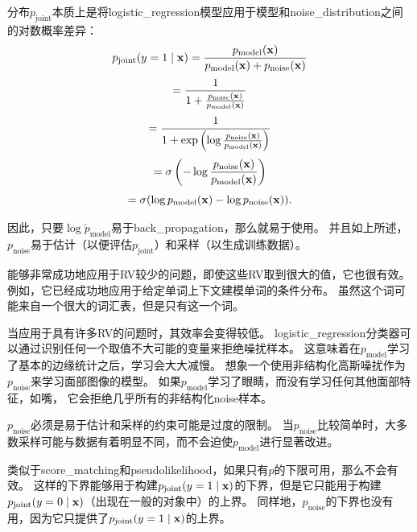 分布$p_{\text{joint}}$本质上是将\gls{logistic_regression}模型应用于模型和\gls{noise_distribution}之间的对数概率差异：
\begin{equation}
	p_{\text{joint}} (y = 1 \mid \mathbf{x}) = \frac{ p_{\text{model}}(\mathbf{x}) }{ p_{\text{model}}(\mathbf{x}) + p_{\text{noise}}(\mathbf{x}) }
\end{equation}
\begin{equation}
 = \frac{1}{1 + \frac{ p_{\text{noise}}(\mathbf{x}) }{ p_{\text{model}}(\mathbf{x}) }}
\end{equation}
\begin{equation}
= \frac{1}{1 + \exp \left( \log \frac{ p_{\text{noise}}(\mathbf{x}) }{ p_{\text{model}}(\mathbf{x}) } \right)}
\end{equation}
\begin{equation}
	= \sigma \left( - \log \frac{ p_{\text{noise}} (\mathbf{x}) }{ p_{\text{model}} (\mathbf{x}) } \right)
\end{equation}
\begin{equation}
	= \sigma ( \log p_{\text{model}} (\mathbf{x}) - \log p_{\text{noise}} (\mathbf{x})  ) .
\end{equation}


因此，只要$\log \tilde{p}_{\text{model}}$易于\gls{back_propagation}，那么就易于使用。
并且如上所述，$p_{\text{noise}}$易于估计（以便评估$p_{\text{joint}}$）和采样（以生成训练数据）。


能够非常成功地应用于\gls{RV}较少的问题，即使这些\gls{RV}取到很大的值，它也很有效。
例如，它已经成功地应用于给定单词上下文建模单词的条件分布\citep{Mnih2013}。
虽然这个词可能来自一个很大的词汇表，但是只有这一个词。


当应用于具有许多\gls{RV}的问题时，其效率会变得较低。
\gls{logistic_regression}分类器可以通过识别任何一个取值不大可能的变量来拒绝噪扰样本。
这意味着在$p_{\text{model}}$学习了基本的边缘统计之后，学习会大大减慢。
想象一个使用非结构化高斯噪扰作为$p_{\text{noise}}$来学习面部图像的模型。
如果$p_{\text{model}}$学习了眼睛，而没有学习任何其他面部特征，如嘴， 它会拒绝几乎所有的非结构化\gls{noise}样本。


$p_{\text{noise}}$必须是易于估计和采样的约束可能是过度的限制。
当$p_{\text{noise}}$比较简单时，大多数采样可能与数据有着明显不同，而不会迫使$p_{\text{model}}$进行显著改进。


类似于\gls{score_matching}和\gls{pseudolikelihood}，如果只有$p$的下限可用，那么不会有效。
这样的下界能够用于构建$p_{\text{joint}}( y = 1 \mid \mathbf{x})$的下界，但是它只能用于构建$p_{\text{joint}}(y = 0 \mid \mathbf{x})$（出现在一般的对象中）的上界。
同样地，$p_{\text{noise}}$的下界也没有用，因为它只提供了$p_{\text{joint}}( y = 1 \mid \mathbf{x})$的上界。


